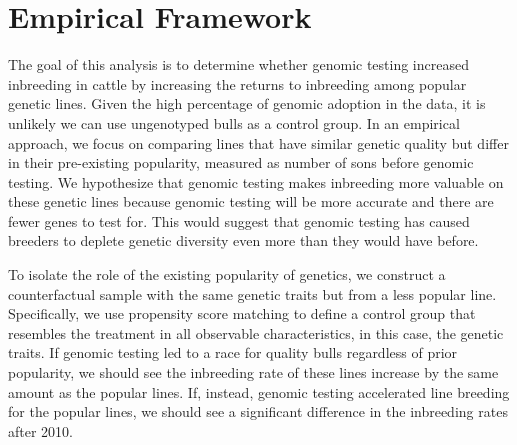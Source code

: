 \documentclass[12pt,letterpaper]{article}
\begin{document}


\section{Empirical Framework\label{sec:emp_frame}}
The goal of this analysis is to determine whether genomic testing increased inbreeding in cattle by increasing the returns to inbreeding among popular genetic lines. Given the high percentage of genomic adoption in the data, it is unlikely we can use ungenotyped bulls as a control group.
In an empirical approach, we focus on comparing lines that have similar genetic quality but differ in their pre-existing popularity, measured as number of sons before genomic testing. We hypothesize that genomic testing makes inbreeding more valuable on these genetic lines because genomic testing will be more accurate and there are fewer genes to test for.
This would suggest that genomic testing has caused breeders to deplete genetic diversity even more than they would have before.

To isolate the role of the existing popularity of genetics, we construct a counterfactual sample with the same genetic traits but from a less popular line.
Specifically, we use propensity score matching \citep{Smith2005} to define a control group that resembles the treatment in all observable characteristics, in this case, the genetic traits. 
If genomic testing led to a race for quality bulls regardless of prior popularity, we should see the inbreeding rate of these lines increase by the same amount as the popular lines.
If, instead, genomic testing accelerated line breeding for the popular lines, we should see a significant difference in the inbreeding rates after 2010.
\end{document}
